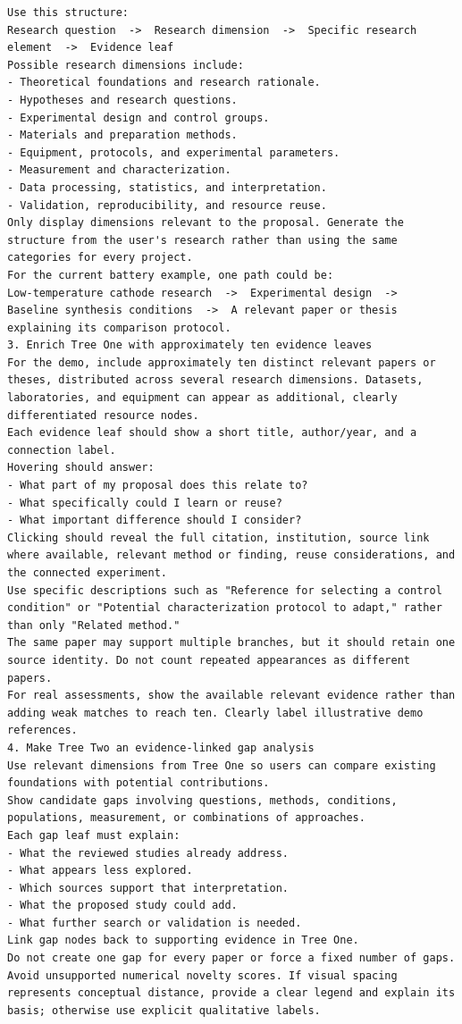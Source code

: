 \documentclass[11pt,a4paper]{article}
\begin{document}
\begin{itemize}[leftmargin=*]
\begin{lstlisting}
Use this structure:
Research question  ->  Research dimension  ->  Specific research element  ->  Evidence leaf
Possible research dimensions include:
- Theoretical foundations and research rationale.
- Hypotheses and research questions.
- Experimental design and control groups.
- Materials and preparation methods.
- Equipment, protocols, and experimental parameters.
- Measurement and characterization.
- Data processing, statistics, and interpretation.
- Validation, reproducibility, and resource reuse.
Only display dimensions relevant to the proposal. Generate the structure from the user's research rather than using the same categories for every project.
For the current battery example, one path could be:
Low-temperature cathode research  ->  Experimental design  ->  Baseline synthesis conditions  ->  A relevant paper or thesis explaining its comparison protocol.
3. Enrich Tree One with approximately ten evidence leaves
For the demo, include approximately ten distinct relevant papers or theses, distributed across several research dimensions. Datasets, laboratories, and equipment can appear as additional, clearly differentiated resource nodes.
Each evidence leaf should show a short title, author/year, and a connection label.
Hovering should answer:
- What part of my proposal does this relate to?
- What specifically could I learn or reuse?
- What important difference should I consider?
Clicking should reveal the full citation, institution, source link where available, relevant method or finding, reuse considerations, and the connected experiment.
Use specific descriptions such as "Reference for selecting a control condition" or "Potential characterization protocol to adapt," rather than only "Related method."
The same paper may support multiple branches, but it should retain one source identity. Do not count repeated appearances as different papers.
For real assessments, show the available relevant evidence rather than adding weak matches to reach ten. Clearly label illustrative demo references.
4. Make Tree Two an evidence-linked gap analysis
Use relevant dimensions from Tree One so users can compare existing foundations with potential contributions.
Show candidate gaps involving questions, methods, conditions, populations, measurement, or combinations of approaches.
Each gap leaf must explain:
- What the reviewed studies already address.
- What appears less explored.
- Which sources support that interpretation.
- What the proposed study could add.
- What further search or validation is needed.
Link gap nodes back to supporting evidence in Tree One.
Do not create one gap for every paper or force a fixed number of gaps. Avoid unsupported numerical novelty scores. If visual spacing represents conceptual distance, provide a clear legend and explain its basis; otherwise use explicit qualitative labels.

\end{lstlisting}
\end{itemize}
\end{document}
